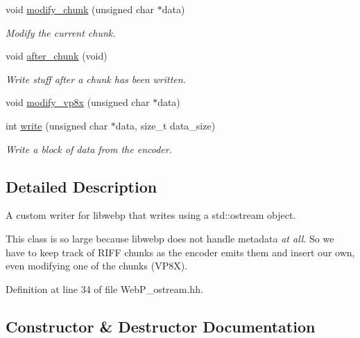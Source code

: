 \begin{DoxyCompactItemize}
void \hyperlink{class_photo_finish_1_1webp__stream__writer_a2c820fe74573fec2da615c31d93d495e}{modify\+\_\+chunk} (unsigned char $\ast$data)
\begin{DoxyCompactList}\small\item\em Modify the current chunk. \end{DoxyCompactList}\item 
void \hyperlink{class_photo_finish_1_1webp__stream__writer_a6f24700d93d1d2d02efad82550b0398b}{after\+\_\+chunk} (void)
\begin{DoxyCompactList}\small\item\em Write stuff after a chunk has been written. \end{DoxyCompactList}\item 
void \hyperlink{class_photo_finish_1_1webp__stream__writer_ac31f3881d6e8ce55d58aa0259ab1ac66}{modify\+\_\+vp8x} (unsigned char $\ast$data)
\item 
int \hyperlink{class_photo_finish_1_1webp__stream__writer_af78944a649643669197131eb73241cf1}{write} (unsigned char $\ast$data, size\+\_\+t data\+\_\+size)
\begin{DoxyCompactList}\small\item\em Write a block of data from the encoder. \end{DoxyCompactList}\end{DoxyCompactItemize}


\subsection{Detailed Description}
A custom writer for libwebp that writes using a std\+::ostream object. 

This class is so large because libwebp does not handle metadata {\itshape at all}. So we have to keep track of R\+I\+FF chunks as the encoder emits them and insert our own, even modifying one of the chunks (V\+P8X). 

Definition at line 34 of file Web\+P\+\_\+ostream.\+hh.



\subsection{Constructor \& Destructor Documentation}
\mbox{\label{class_photo_finish_1_1webp__stream__writer_affd26ebc255f3cf910c74cdf577cf3a5}} 
